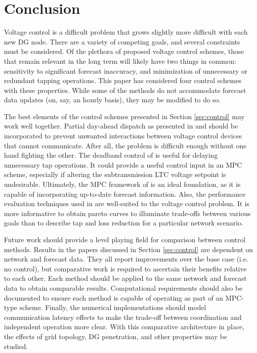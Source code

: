 \documentclass[10pt,letterpaper]{article}
\begin{document}
\section{Conclusion}
\label{sec:conclusion}
Voltage control is a difficult problem that grows slightly more difficult with each new DG node. There are a variety of competing goals, and several constraints must be considered. Of the plethora of proposed voltage control schemes, those that remain relevant in the long term will likely have two things in common: sensitivity to significant forecast inaccuracy, and minimization of unnecessary or redundant tapping operations. This paper has considered four control schemes with these properties. While some of the methods do not accommodate forecast data updates (on, say, an hourly basis), they may be modified to do so.

The best elements of the control schemes presented in Section \ref{sec:control} may work well together. Partial day-ahead dispatch as presented in \cite{agalgaonkar2014} and \cite{park2007} should be incorporated to prevent unwanted interactions between voltage control devices that cannot communicate. After all, the problem is difficult enough without one hand fighting the other. The deadband control of \cite{choi2009} is useful for delaying unnecessary tap operations. It could provide a useful control input in an MPC scheme, especially if altering the subtransmission LTC voltage setpoint is undesirable. Ultimately, the MPC framework of \cite{baghsorkhi2015} is an ideal foundation, as it is capable of incorporating up-to-date forecast information. Also, the performance evaluation techniques used in \cite{baghsorkhi2015} are well-suited to the voltage control problem. It is more informative to obtain pareto curves to illuminate trade-offs between various goals than to describe tap and loss reduction for a particular network scenario.

Future work should provide a level playing field for comparison between control methods. Results in the papers discussed in Section \ref{sec:control} are dependent on network and forecast data. They all report improvements over the base case (i.e. no control), but comparative work is required to ascertain their benefits relative to each other. Each method should be applied to the same network and forecast data to obtain comparable results. Computational requirements should also be documented to ensure each method is capable of operating as part of an MPC-type scheme. Finally, the numerical implementations should model communication latency effects to make the trade-off between coordination and independent operation more clear. With this comparative architecture in place, the effects of grid topology, DG penetration, and other properties may be studied.
\end{document}
